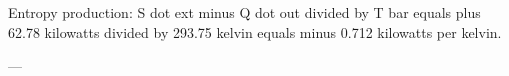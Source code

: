 Entropy production:  
S dot ext minus Q dot out divided by T bar equals plus 62.78 kilowatts divided by 293.75 kelvin equals minus 0.712 kilowatts per kelvin.  

---
